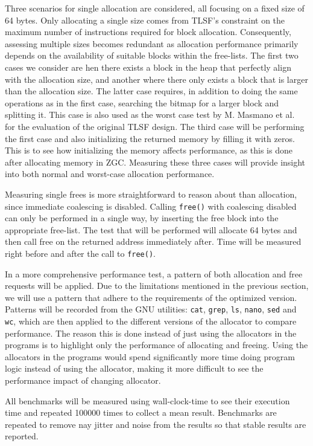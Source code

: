 Three scenarios for single allocation are considered, all focusing on a fixed size of 64 bytes. Only allocating a single size comes from TLSF's constraint on the maximum number of instructions required for block allocation. Consequently, assessing multiple sizes becomes redundant as allocation performance primarily depends on the availability of suitable blocks within the free-lists. The first two cases we consider are hen there exists a block in the heap that perfectly align with the allocation size, and another where there only exists a block that is larger than the allocation size. The latter case requires, in addition to doing the same operations as in the first case, searching the bitmap for a larger block and splitting it. This case is also used as the worst case test by M. Masmano et al.~\cite{TLSF} for the evaluation of the original TLSF design. The third case will be performing the first case and also initializing the returned memory by filling it with zeros. This is to see how initializing the memory affects performance, as this is done after allocating memory in ZGC. Measuring these three cases will provide insight into both normal and worst-case allocation performance.

Measuring single frees is more straightforward to reason about than allocation, since immediate coalescing is disabled. Calling \texttt{free()} with coalescing disabled can only be performed in a single way, by inserting the free block into the appropriate free-list. The test that will be performed will allocate 64 bytes and then call free on the returned address immediately after. Time will be measured right before and after the call to \texttt{free()}.

In a more comprehensive performance test, a pattern of both allocation and free requests will be applied. Due to the limitations mentioned in the previous section, we will use a pattern that adhere to the requirements of the optimized version. Patterns will be recorded from the GNU utilities: \texttt{cat}, \texttt{grep}, \texttt{ls}, \texttt{nano}, \texttt{sed} and \texttt{wc}, which are then applied to the different versions of the allocator to compare performance. The reason this is done instead of just using the allocators in the programs is to highlight only the performance of allocating and freeing. Using the allocators in the programs would spend significantly more time doing program logic instead of using the allocator, making it more difficult to see the performance impact of changing allocator.

All benchmarks will be measured using wall-clock-time to see their execution time and repeated 100000 times to collect a mean result. Benchmarks are repeated to remove nay jitter and noise from the results so that stable results are reported.

